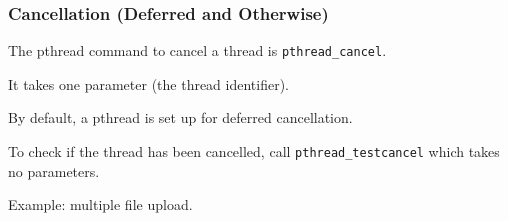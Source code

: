 \begin{frame}
\frametitle{Cancellation (Deferred and Otherwise)}

The pthread command to cancel a thread is \texttt{pthread\_cancel}.

It takes one parameter (the thread identifier). 

By default, a pthread is set up for deferred cancellation. 

To check if the thread has been cancelled, call  \texttt{pthread\_testcancel} which takes no parameters.

Example: multiple file upload.

\end{frame}



